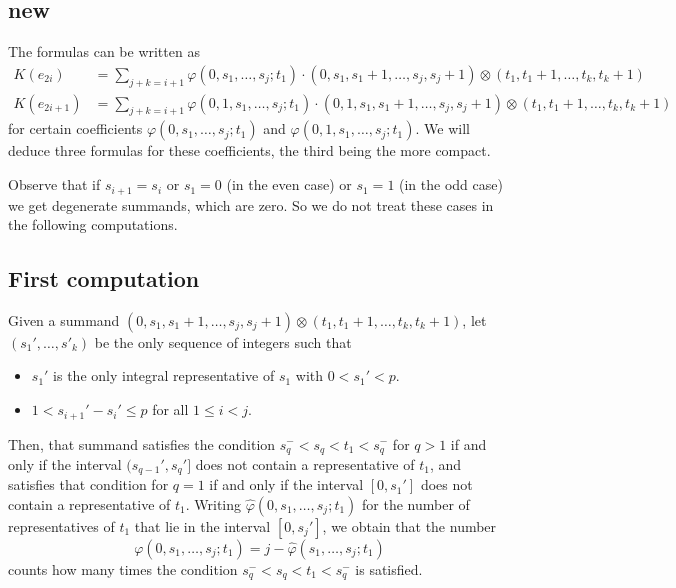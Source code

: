 \subsection{new}

	The formulas can be written as
\begin{align*}
	K(e_{2i}) &= \sum_{j+k = i+1} \varphi(0,s_1,\ldots,s_j;t_1)\cdot (0,s_1,s_1+1,\ldots,s_j,s_j+1)\otimes(t_1,t_1+1,\ldots,t_k,t_k+1) \\
	K(e_{2i+1}) &= \sum_{j+k = i+1} \varphi(0,1,s_1,\ldots,s_j;t_1)\cdot (0,1,s_1,s_1+1,\ldots,s_j,s_j+1)\otimes(t_1,t_1+1,\ldots,t_k,t_k+1)
\end{align*}
for certain coefficients $\varphi(0,s_1,\ldots,s_j;t_1)$ and $\varphi(0,1,s_1,\ldots,s_j;t_1)$. We will deduce three formulas for these coefficients, the third being the more compact.

Observe that if $s_{i+1} = s_i$ or $s_1 = 0$ (in the even case) or $s_1=1$ (in the odd case) we get degenerate summands, which are zero. So we do not treat these cases in the following computations.

\subsection*{First computation} Given a summand $(0,s_1,s_1+1,\ldots,s_j,s_j+1)\otimes (t_1,t_1+1,\ldots,t_k,t_k+1)$, let $(s_1',\ldots,s'_k)$ be the only sequence of integers such that
\begin{itemize}
	\item $s_1'$ is the only integral representative of $s_1$ with $0< s_1'< p$.
	\item $1<s_{i+1}'-s_i'\leq p$ for all $1\leq i<j$.
\end{itemize}
Then, that summand satisfies the condition $s_q^-<s_q<t_1<s_q^-$ for $q>1$ if and only if the interval $(s_{q-1}',s_q']$ does not contain a representative of $t_1$, and satisfies that condition for $q=1$ if and only if the interval $[0,s_1']$ does not contain a representative of $t_1$. Writing $\hat{\varphi}(0,s_1,\ldots,s_j;t_1)$ for the number of representatives of $t_1$ that lie in the interval $[0,s_j']$, we obtain that the number
\[\varphi(0,s_1,\ldots,s_j;t_1) = j-\hat{\varphi}(s_1,\ldots,s_j;t_1)\]
counts how many times the condition $s_q^-<s_q<t_1<s_q^-$ is satisfied.

